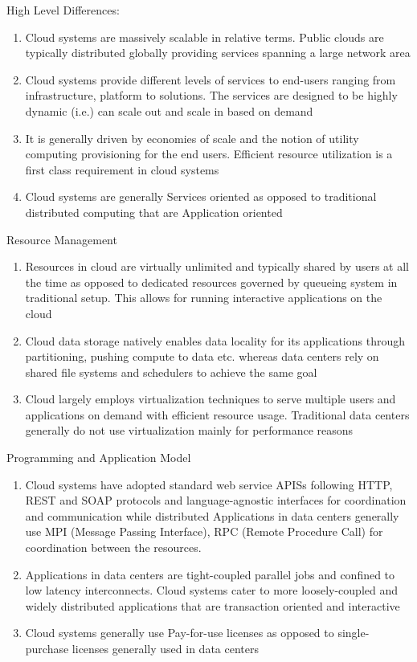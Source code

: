 \documentclass[11pt,a4paper,oneside]{article}
\begin{document}
\begin{enumerate}
                High Level Differences:
                \begin{enumerate}
                	\item Cloud systems are massively scalable in relative terms. Public clouds are typically distributed globally providing services spanning a large network area
                	\item Cloud systems provide different levels of services to end-users ranging from infrastructure, platform to solutions. The services are designed to be highly dynamic (i.e.) can scale out and scale in based on demand
                	\item It is generally driven by economies of scale and the notion of utility computing provisioning for the end users. Efficient resource utilization is a first class requirement in cloud systems 
                	\item Cloud systems are generally Services oriented as opposed to traditional distributed computing that are Application oriented
                \end{enumerate}
                Resource Management
                \begin{enumerate}
                	\item Resources in cloud are virtually unlimited and typically shared by users at all the time as opposed to dedicated resources governed by queueing system in traditional setup. This allows for running interactive applications on the cloud
                	\item Cloud data storage natively enables data locality for its applications through partitioning, pushing compute to data etc. whereas data centers rely on shared file systems and schedulers to achieve the same goal
                	\item Cloud largely employs virtualization techniques to serve multiple users and applications on demand with efficient resource usage. Traditional data centers generally do not use virtualization mainly for performance reasons
                \end{enumerate}
                Programming and Application Model
                \begin{enumerate}
                	\item Cloud systems have adopted standard web service APISs following HTTP, REST and SOAP protocols and language-agnostic interfaces for coordination and communication while distributed Applications in data centers generally use MPI (Message Passing Interface), RPC (Remote Procedure Call) for coordination between the resources.   
                	\item Applications in data centers are tight-coupled parallel jobs and confined to low latency interconnects. Cloud systems cater to more loosely-coupled and widely distributed applications that are transaction oriented and interactive
                	\item Cloud systems generally use Pay-for-use licenses as opposed to single-purchase licenses generally used in data centers
                \end{enumerate}   	
         

\end{enumerate}
\end{document}

